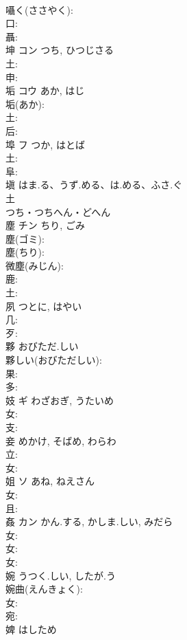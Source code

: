 \documentclass[8pt]{extreport}
\begin{document}
\begin{CJK}{UTF8}{min}
\\	囁く(ささやく): 
\\	口: 
\\	聶: 
\\	坤	コン	つち, ひつじさる		
\\	土: 
\\	申: 
\\	垢	コウ	あか, はじ		
\\	垢(あか): 
\\	土: 
\\	后: 
\\	埠	フ	つか, はとば		
\\	土: 
\\	阜: 
\\	塡		はま.る、うず.める、は.める、ふさ.ぐ		
\\	土	
\\	つち・つちへん・どへん	
\\	塵	チン	ちり, ごみ		
\\	塵(ゴミ): 
\\	塵(ちり): 
\\	微塵(みじん): 
\\	鹿: 
\\	土: 
\\	夙		つとに, はやい			
\\	几: 
\\	歹: 
\\	夥		おびただ.しい			
\\	夥しい(おびただしい): 
\\	果: 
\\	多: 
\\	妓	ギ	わざおぎ, うたいめ		
\\	女: 
\\	支: 
\\	妾		めかけ, そばめ, わらわ			
\\	立: 
\\	女: 
\\	姐	ソ	あね, ねえさん		
\\	女: 
\\	且: 
\\	姦	カン	かん.する, かしま.しい, みだら		
\\	女: 
\\	女: 
\\	女: 
\\	婉		うつく.しい, したが.う			
\\	婉曲(えんきょく): 
\\	女: 
\\	宛: 
\\	婢		はしため			

\end{CJK}
\end{document}
